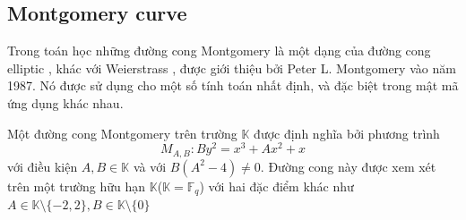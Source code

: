 \documentclass[a4paper,12pt]{report}
\begin{document}
\subsection*{Montgomery curve}
Trong toán học những đường cong Montgomery là một dạng của đường cong elliptic , khác với Weierstrass , được giới thiệu bởi Peter L. Montgomery vào năm 1987. Nó được sử dụng cho một số tính toán nhất định, và đặc biệt trong mật mã ứng dụng khác nhau.

Một đường cong Montgomery trên trường $\mathbb{K}$ được định nghĩa bởi phương trình 
\begin{displaymath}
M_{A,B}: By^2 = x^3 + Ax^2 + x
\end{displaymath}
với điều kiện $A, B \in \mathbb{K}$ và với $B(A^2 - 4) \neq 0$. Đường cong này được xem xét trên một trường hữu hạn $\mathbb{K}$($\mathbb{K} = \mathbb{F}_q$) với hai đặc điểm khác như $A \in \mathbb{K} \setminus \{-2, 2\}, B \in \mathbb{K} \setminus\{0\}$
\end{document}
